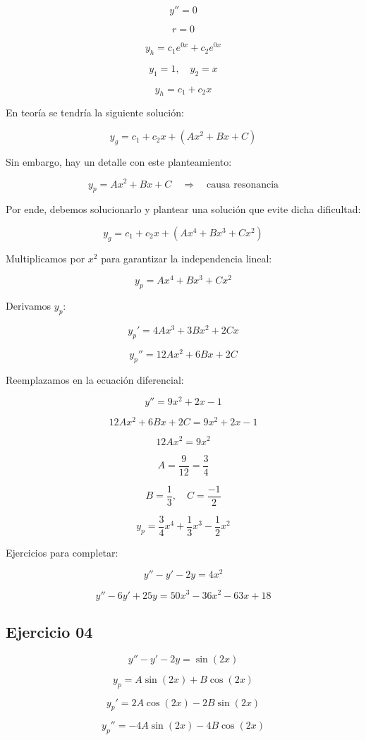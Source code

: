 \[
y'' = 0
\]

\[
r = 0
\]

\[
y_h = c_1 e^{0x} + c_2 e^{0x}
\]

\[
y_1 = 1, \quad y_2 = x
\]

\[
y_h = c_1 + c_2 x
\]

En teoría se tendría la siguiente solución:

\[
y_g = c_1 + c_2 x + \left(Ax^2 + Bx + C\right)
\]

Sin embargo, hay un detalle con este planteamiento:

\[
y_p = Ax^2 + Bx + C \quad \Rightarrow \quad \text{causa resonancia}
\]

Por ende, debemos solucionarlo y plantear una solución que evite dicha dificultad:

\[
y_g = c_1 + c_2 x + \left(Ax^4 + Bx^3 + Cx^2\right)
\]

Multiplicamos por \( x^2 \) para garantizar la independencia lineal:

\[
y_p = Ax^4 + Bx^3 + Cx^2
\]

Derivamos \( y_p \):

\[
y_p' = 4A x^3 + 3B x^2 + 2C x
\]

\[
y_p'' = 12A x^2 + 6B x + 2C
\]

Reemplazamos en la ecuación diferencial:

\[
y'' = 9x^2 + 2x -1
\]

\[
12A x^2 + 6B x + 2C = 9x^2 + 2x - 1
\]

\[
12A x^2 = 9x^2
\]

\[
A = \frac{9}{12} = \frac{3}{4}
\]

\[
B = \frac{1}{3}, \quad C = \frac{-1}{2}
\]

\[
y_p = \frac{3}{4} x^4 + \frac{1}{3} x^3 - \frac{1}{2} x^2
\]

Ejercicios para completar:

\[
y'' - y' - 2y = 4x^2
\]

\[
y'' - 6y' + 25y = 50x^3 - 36x^2 - 63x + 18
\]

\subsection*{Ejercicio 04}


\[
y'' - y' - 2y = \sin(2x)
\]

\[
y_p = A\sin(2x) + B\cos(2x)
\]

\[
y_p' = 2A\cos(2x) - 2B\sin(2x)
\]

\[
y_p'' = -4A\sin(2x) - 4B\cos(2x)
\]

